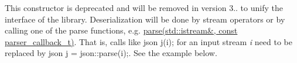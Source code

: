 
\begin{DoxyRefList}
\item[\label{deprecated__deprecated000001}%
\Hypertarget{deprecated__deprecated000001}%
Member \hyperlink{classnlohmann_1_1basic__json_a32350263eb105764844c5a85e156a255}{nlohmann\+:\+:basic\+\_\+json$<$ Object\+Type, Array\+Type, String\+Type, Boolean\+Type, Number\+Integer\+Type, Number\+Unsigned\+Type, Number\+Float\+Type, Allocator\+Type $>$\+:\+:basic\+\_\+json} (std\+::istream \&i, const parser\+\_\+callback\+\_\+t cb=nullptr)]This constructor is deprecated and will be removed in version 3.. to unify the interface of the library. Deserialization will be done by stream operators or by calling one of the {\ttfamily parse} functions, e.\+g. \hyperlink{classnlohmann_1_1basic__json_a0923f9749409345a21f8cb15ee95fc0d}{parse(std\+::istream\&, const parser\+\_\+callback\+\_\+t)}. That is, calls like {\ttfamily json j(i);} for an input stream {\itshape i} need to be replaced by {\ttfamily json j = json\+::parse(i);}. See the example below.
\end{DoxyRefList}